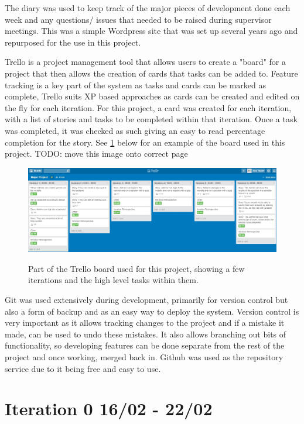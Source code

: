 The diary was used to keep track of the major pieces of development done each week and any questions/ issues that needed to be raised during supervisor meetings. This was a simple Wordpress site that was set up several years ago and repurposed for the use in this project.

Trello is a project management tool that allows users to create a "board" for a project that then allows the creation of cards that tasks can be added to\cite{trello}. Feature tracking is a key part of the system as tasks and cards can be marked as complete, Trello suits XP based approaches as cards can be created and edited on the fly for each iteration. For this project, a card was created for each iteration, with a list of stories and tasks to be completed within that iteration. Once a task was completed, it was checked as such giving an easy to read percentage completion for the story. See \ref{fig:trello-board} below for an example of the board used in this project. TODO: move this image onto correct page

\begin{figure}
	\caption{Part of the Trello board used for this project, showing a few iterations and the high level tasks within them.}
	\includegraphics[width=\textwidth]{Chapter2/trello-board}
	\label{fig:trello-board}
\end{figure}
\newpage

Git was used extensively during development, primarily for version control but also a form of backup and as an easy way to deploy the system. Version control is very important as it allows tracking changes to the project and if a mistake it made, can be used to undo these mistakes. It also allows branching out bits of functionality, so developing features can be done separate from the rest of the project and once working, merged back in. Github was used as the repository service due to it being free and easy to use\cite{github}.
\newpage

\section{Iteration 0 16/02 - 22/02}


